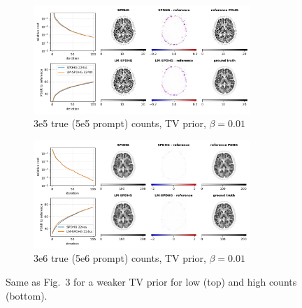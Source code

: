 \documentclass[10pt,twocolumn,twoside]{article}
\begin{document}
\renewcommand{\figurename}{Supplementary Figure}

\begin{figure}
  \centering
  \begin{subfigure}[]{1.0\textwidth}
    \centering
    \includegraphics[width=0.9\textwidth]{./figureS1a_brain2d_counts_3.0E+05_seed_1_beta_1.0E-02_prior_TV_niter_ref_20000_fwhm_4.5_4.5_niter_100.png}
    \caption{3e5 true (5e5 prompt) counts, TV prior, $\beta = 0.01$}
  \end{subfigure}
  \vfill
  \begin{subfigure}[]{1.0\textwidth}
    \centering
    \includegraphics[width=0.9\textwidth]{./figureS1b_brain2d_counts_3.0E+06_seed_1_beta_1.0E-02_prior_TV_niter_ref_20000_fwhm_4.5_4.5_niter_100.png}
    \caption{3e6 true (5e6 prompt) counts, TV prior, $\beta = 0.01$}
  \end{subfigure}
  \caption{Same as Fig.~3 for a weaker TV prior for low (top) and high counts (bottom).}
\end{figure}
\end{document}
